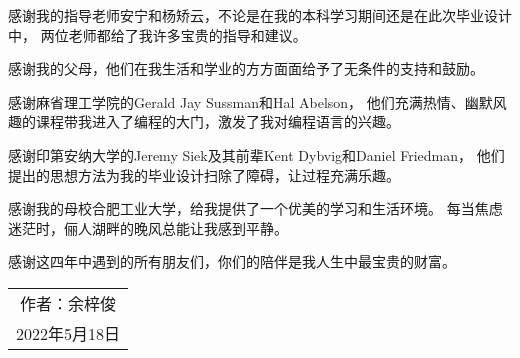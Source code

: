 
\begin{acknowledgements}

感谢我的指导老师安宁和杨矫云，不论是在我的本科学习期间还是在此次毕业设计中，
两位老师都给了我许多宝贵的指导和建议。

感谢我的父母，他们在我生活和学业的方方面面给予了无条件的支持和鼓励。

感谢麻省理工学院的Gerald Jay Sussman和Hal Abelson，
他们充满热情、幽默风趣的课程带我进入了编程的大门，激发了我对编程语言的兴趣。

感谢印第安纳大学的Jeremy Siek及其前辈Kent Dybvig和Daniel Friedman，
他们提出的思想方法为我的毕业设计扫除了障碍，让过程充满乐趣。

感谢我的母校合肥工业大学，给我提供了一个优美的学习和生活环境。
每当焦虑迷茫时，俪人湖畔的晚风总能让我感到平静。

感谢这四年中遇到的所有朋友们，你们的陪伴是我人生中最宝贵的财富。

\begin{flushright}
\begin{tabular}{ c }
\\
作者：余梓俊 \\
2022年5月18日
\end{tabular}
\end{flushright}


\end{acknowledgements}
